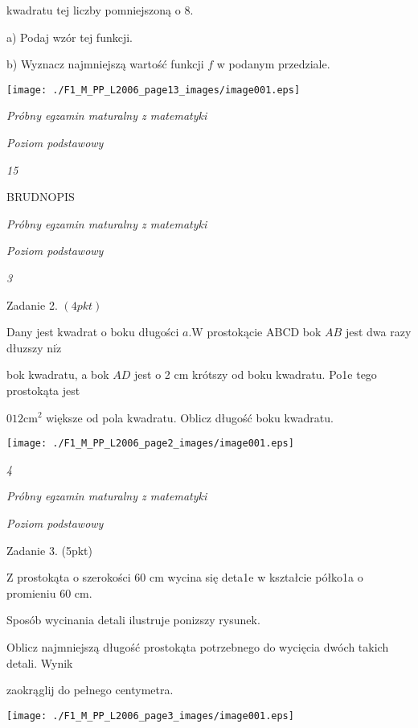 \documentclass[a4paper,12pt]{article}
\begin{document}
kwadratu tej liczby pomniejszoną o 8.

a) Podaj wzór tej funkcji.

b) Wyznacz najmniejszą wartość funkcji $f$ w podanym przedziale.
\begin{center}
\texttt{[image: ./F1\_M\_PP\_L2006\_page13\_images/image001.eps]}
\end{center}




{\it Próbny egzamin maturalny z matematyki}

{\it Poziom podstawowy}

{\it 15}

BRUDNOPIS





{\it Próbny egzamin maturalny z matematyki}

{\it Poziom podstawowy}

{\it 3}

Zadanie 2. $(4pkt)$

Dany jest kwadrat o boku długości $a. \mathrm{W}$ prostokącie ABCD bok $AB$ jest dwa razy dłuzszy $\mathrm{n}\mathrm{i}\dot{\mathrm{z}}$

bok kwadratu, a bok $AD$ jest o 2 cm krótszy od boku kwadratu. Po1e tego prostokąta jest

$012\mathrm{c}\mathrm{m}^{2}$ większe od pola kwadratu. Oblicz długość boku kwadratu.
\begin{center}
\texttt{[image: ./F1\_M\_PP\_L2006\_page2\_images/image001.eps]}
\end{center}




{\it 4}

{\it Próbny egzamin maturalny z matematyki}

{\it Poziom podstawowy}

Zadanie 3. (5pkt)

Z prostokąta o szerokości 60 cm wycina się deta1e w kształcie półko1a o promieniu 60 cm.

Sposób wycinania detali ilustruje ponizszy rysunek.

Oblicz najmniejszą długość prostokąta potrzebnego do wycięcia dwóch takich detali. Wynik

zaokrąglij do pełnego centymetra.
\begin{center}
\texttt{[image: ./F1\_M\_PP\_L2006\_page3\_images/image001.eps]}
\end{center}
\end{document}
